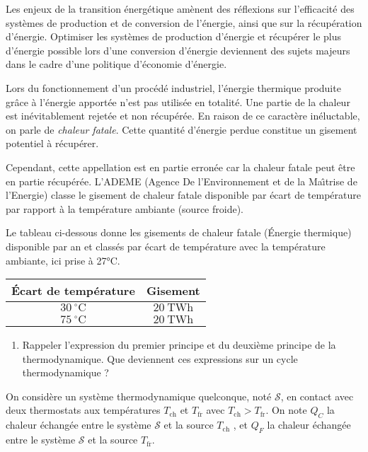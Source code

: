 \documentclass[
  10pt,
  french,
  a4paper,
  DIV=18]{scrartcl}
\providecommand{\tightlist}{%
  \setlength{\itemsep}{0pt}\setlength{\parskip}{0pt}}
\begin{document}
Les enjeux de la transition énergétique amènent des réflexions sur
l'efficacité des systèmes de production et de conversion de l'énergie,
ainsi que sur la récupération d'énergie. Optimiser les systèmes de
production d'énergie et récupérer le plus d'énergie possible lors d'une
conversion d'énergie deviennent des sujets majeurs dans le cadre d'une
politique d'économie d'énergie.

Lors du fonctionnement d'un procédé industriel, l'énergie thermique
produite grâce à l'énergie apportée n'est pas utilisée en totalité. Une
partie de la chaleur est inévitablement rejetée et non récupérée. En
raison de ce caractère inéluctable, on parle de \emph{chaleur fatale}.
Cette quantité d'énergie perdue constitue un gisement potentiel à
récupérer.

Cependant, cette appellation est en partie erronée car la chaleur fatale
peut être en partie récupérée. L'ADEME (Agence De l'Environnement et de
la Maı̂trise de l'Energie) classe le gisement de chaleur fatale
disponible par écart de température par rapport à la température
ambiante (source froide).

Le tableau ci-dessous donne les gisements de chaleur fatale (Énergie
thermique) disponible par an et classés par écart de température avec la
température ambiante, ici prise à 27°C.

\begin{longtable}[]{@{}cc@{}}
\toprule\noalign{}
Écart de température & Gisement \\
\midrule\noalign{}
\endhead
\bottomrule\noalign{}
\endlastfoot
\(30\ ^\circ\mathrm{C}\) & \(20\ \mathrm{TWh}\) \\
\(75\ ^\circ\mathrm{C}\) & \(20\ \mathrm{TWh}\) \\
\end{longtable}

\begin{enumerate}
\def\labelenumi{\arabic{enumi}.}
\tightlist
\item
  Rappeler l'expression du premier principe et du deuxième principe de
  la thermodynamique. Que deviennent ces expressions sur un cycle
  thermodynamique ?
\end{enumerate}

On considère un système thermodynamique quelconque, noté
\(\mathcal{S}\), en contact avec deux thermostats aux températures
\(T_\mathrm{ch}\) et \(T_\mathrm{fr}\) avec
\(T_\mathrm{ch} > T_\mathrm{fr}\). On note \(Q_C\) la chaleur échangée
entre le système \(\mathcal{S}\) et la source \(T_\mathrm{ch}\) , et
\(Q_F\) la chaleur échangée entre le système \(\mathcal{S}\) et la
source \(T_\mathrm{fr}\).
\end{document}

